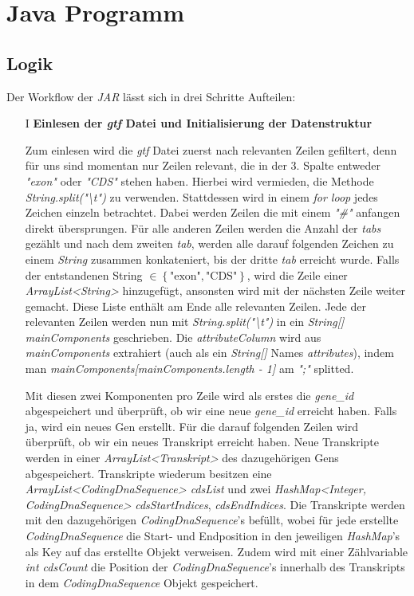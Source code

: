 \documentclass[12pt]{article}
\begin{document}
\section{Java Programm}
\subsection{Logik}\label{sec:logik}
Der Workflow der \textit{JAR} lässt sich in drei Schritte Aufteilen:
\begin{enumerate}
    \item[I] \textbf{Einlesen der \textit{gtf} Datei und Initialisierung der Datenstruktur}

        Zum einlesen wird die \textit{gtf} Datei zuerst nach relevanten Zeilen gefiltert, denn
        für uns sind momentan nur Zeilen relevant, die in der 3. Spalte entweder
        \textit{"exon"} oder \textit{"CDS"} stehen haben. Hierbei wird vermieden,
        die Methode \textit{String.split("\textbackslash t")} zu verwenden.
        Stattdessen wird in einem \textit{for loop} jedes Zeichen einzeln betrachtet.
        Dabei werden Zeilen die mit einem \textit{"\#"} anfangen direkt übersprungen.
        Für alle anderen Zeilen werden die Anzahl der \textit{tabs} gezählt und nach 
        dem zweiten \textit{tab}, werden alle darauf folgenden Zeichen zu einem 
        \textit{String} zusammen konkateniert, bis der dritte \textit{tab} 
        erreicht wurde. Falls der entstandenen String $\in \left\{\text{"exon"}, \text{"CDS"} \right\}$, wird die 
        Zeile einer \textit{ArrayList<String>} hinzugefügt, ansonsten wird mit der nächsten Zeile weiter gemacht. 
        Diese Liste enthält am Ende alle relevanten Zeilen. 
        Jede der relevanten Zeilen werden nun mit \textit{String.split("\textbackslash t")} in
        ein \textit{String[] mainComponents} geschrieben. Die \textit{attributeColumn} wird aus
        \textit{mainComponents} extrahiert (auch als ein \textit{String[]} Names \textit{attributes}),
        indem man \textit{mainComponents[mainComponents.length - 1]} am \textit{";"} splitted.

        Mit diesen zwei Komponenten pro Zeile wird als erstes die \textit{gene\_id} abgespeichert
        und überprüft, ob wir eine neue \textit{gene\_id} erreicht haben. 
        Falls ja, wird ein neues Gen erstellt. Für die darauf folgenden Zeilen wird überprüft,
        ob wir ein neues Transkript erreicht haben. Neue Transkripte werden in einer
        \textit{ArrayList<Transkript>} des dazugehörigen Gens abgespeichert. 
        Transkripte wiederum besitzen eine \textit{ArrayList<CodingDnaSequence> cdsList} und zwei
        \textit{HashMap<Integer, CodingDnaSequence>} \textit{cdsStartIndices}, \textit{cdsEndIndices}. Die Transkripte werden mit den dazugehörigen
        \textit{CodingDnaSequence}'s befüllt, wobei für jede erstellte \textit{CodingDnaSequence} die Start- und 
        Endposition in den jeweiligen \textit{HashMap}'s als Key auf das erstellte Objekt verweisen.
        Zudem wird mit einer Zählvariable \textit{int cdsCount} die Position der \textit{CodingDnaSequence}'s
        innerhalb des Transkripts in dem \textit{CodingDnaSequence} Objekt gespeichert.


\end{enumerate}
\end{document}
